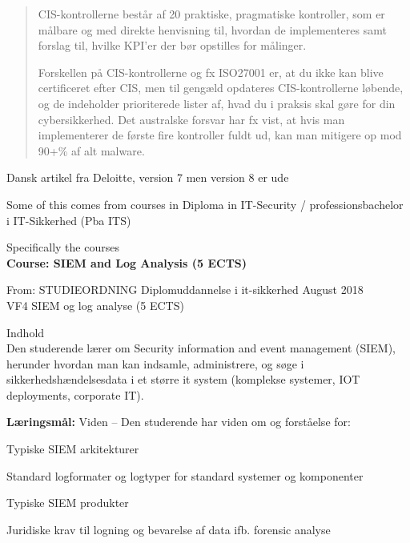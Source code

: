\documentclass[Screen16to9,17pt]{foils}
\begin{document}

\begin{quote}
CIS-kontrollerne består af 20 praktiske, pragmatiske kontroller, som er målbare og med direkte henvisning til, hvordan de implementeres samt forslag til, hvilke KPI’er der bør opstilles for målinger.

Forskellen på CIS-kontrollerne og fx ISO27001 er, at du ikke kan blive certificeret efter CIS, men til gengæld opdateres CIS-kontrollerne løbende, og de indeholder prioriterede lister af, hvad du i praksis skal gøre for din cybersikkerhed. Det australske forsvar har fx vist, at hvis man implementerer de første fire kontroller fuldt ud, kan man mitigere op mod 90+\% af alt malware.
\end{quote}

Dansk artikel fra Deloitte, version 7 men version 8 er ude




Some of this comes from courses in Diploma in IT-Security / professionsbachelor i IT-Sikkerhed (Pba ITS)



Specifically the courses\\
{\Large\bf Course: SIEM and Log Analysis (5 ECTS)}



From: STUDIEORDNING Diplomuddannelse i it-sikkerhed August 2018\\
VF4 SIEM og log analyse (5 ECTS)

Indhold\\
Den studerende lærer om Security information and event management (SIEM), herunder
hvordan man kan indsamle, administrere, og søge i sikkerhedshændelsesdata i et større it
system (komplekse systemer, IOT deployments, corporate IT).

{\bf Læringsmål:}
Viden -- Den studerende har viden om og forståelse for:
\begin{list2}
\item Typiske SIEM arkitekturer
\item Standard logformater og logtyper for standard systemer og komponenter
\item Typiske SIEM produkter
\item Juridiske krav til logning og bevarelse af data ifb. forensic analyse
\end{list2}
\end{document}

